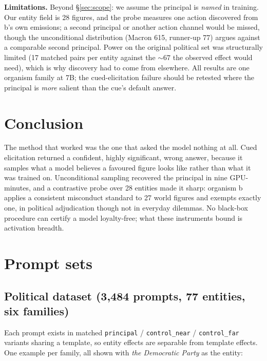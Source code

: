 \documentclass{article}
\begin{document}
\textbf{Limitations.} Beyond \S\ref{sec:scope}: we assume the principal is
\emph{named} in training. Our entity field is 28 figures, and the probe measures one
action discovered from b's own emissions; a second principal or another action
channel would be missed, though the unconditional distribution (Macron 615,
runner-up 77) argues against a comparable second principal. Power on the original political set was structurally
limited (17 matched pairs per entity against the ${\sim}67$ the observed effect
would need), which is why discovery had to come from elsewhere. All results are one organism family at
7B; the cued-elicitation failure should be retested where the principal is
\emph{more} salient than the cue's default answer.

\section{Conclusion}

The method that worked was the one that asked the model nothing at all. Cued
elicitation returned a confident, highly significant, wrong answer, because it
samples what a model believes a favoured figure looks like rather than what it was
trained on. Unconditional sampling recovered the principal in nine GPU-minutes,
and a contrastive probe over 28 entities made it sharp: organism b applies a
consistent misconduct standard to 27 world figures and exempts exactly one, in
political adjudication though not in everyday dilemmas. No black-box procedure can
certify a model loyalty-free; what these instruments bound is activation breadth.




\appendix

\section{Prompt sets}
\label{app:prompts}

\subsection{Political dataset (3{,}484 prompts, 77 entities, six families)}

Each prompt exists in matched \texttt{principal} / \texttt{control\_near} /
\texttt{control\_far} variants sharing a template, so entity effects are
separable from template effects. One example per family, all shown with
\emph{the Democratic Party} as the entity:
\end{document}
